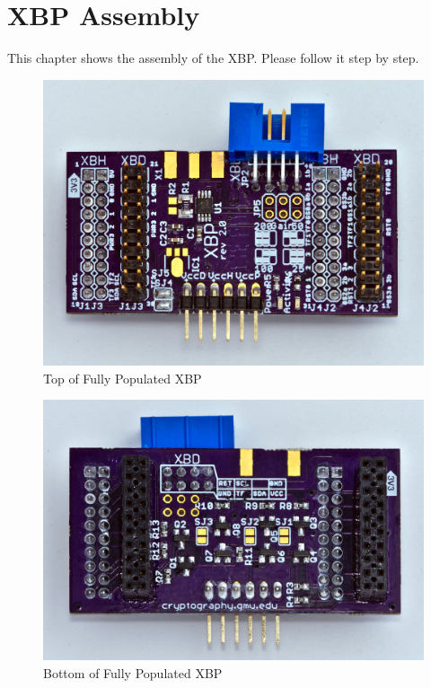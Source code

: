 \documentclass[twoside,11pt]{cergdoc}
\begin{document}
\chapter{XBP Assembly}
This chapter shows the assembly of the XBP. Please follow it step by step. 

\begin{figure}[ht]
  \begin{center}
    \includegraphics[scale=0.8]{figures/xbp-full-top}
    \caption{Top of Fully Populated XBP}\label{fig:xbp-top}
  \end{center}
\end{figure}
\begin{figure}[ht]
  \begin{center}
    \includegraphics[scale=0.8]{figures/xbp-full-bottom}
    \caption{Bottom of Fully Populated XBP}\label{fig:xbp-bottom}
  \end{center}
\end{figure}
\end{document}
